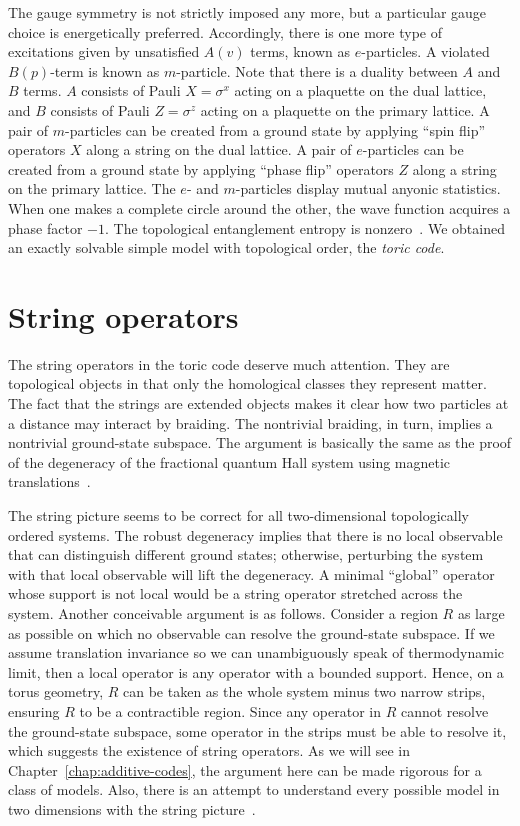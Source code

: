 The gauge symmetry is not strictly imposed any more, but a particular gauge choice is energetically preferred.
Accordingly, there is one more type of excitations given by unsatisfied $A(v)$ terms, known as $e$-particles.
A violated $B(p)$-term is known as $m$-particle. 
Note that there is a duality between $A$ and $B$ terms. 
$A$ consists of Pauli $X = \sigma^x$ acting on a plaquette on the dual lattice, 
and $B$ consists of Pauli $Z = \sigma^z$ acting on a plaquette on the primary lattice. 
A pair of $m$-particles can be created from a ground state 
by applying ``spin flip'' operators $X$ along a string on the dual lattice.
A pair of $e$-particles can be created from a ground state by applying ``phase flip'' operators $Z$ along a string on the primary lattice. The $e$- and $m$-particles display mutual anyonic statistics. When one makes a complete circle around the other, the wave function acquires a phase factor $-1$. The topological entanglement entropy is nonzero~\cite{KitaevPreskill2006Topological, LevinWen2006Detecting}. We obtained an exactly solvable simple model with topological order, the {\em toric code}.


\section{String operators}

The string operators in the toric code deserve much attention. They are topological objects in that only the homological classes they represent matter. The fact that the strings are extended objects makes it clear how two particles at a distance may interact by braiding. The nontrivial braiding, in turn, implies a nontrivial ground-state subspace. The argument is basically the same as the proof of the degeneracy of the fractional quantum Hall system using magnetic translations~\cite{Haldane1985MagneticTranslation}.

The string picture seems to be correct for all two-dimensional topologically ordered systems. The robust degeneracy implies that there is no local observable that can distinguish different ground states; otherwise, perturbing the system with that local observable will lift the degeneracy. A minimal ``global'' operator whose support is not local would be a string operator stretched across the system. Another conceivable argument is as follows. Consider a region $R$ as large as possible on which no observable can resolve the ground-state subspace. If we assume translation invariance so we can unambiguously speak of thermodynamic limit, then a local operator is any operator with a bounded support. Hence, on a torus geometry, $R$ can be taken as the whole system minus two narrow strips, ensuring $R$ to be a contractible region. Since any operator in $R$ cannot resolve the ground-state subspace, some operator in the strips must be able to resolve it, which suggests the existence of string operators. As we will see in Chapter~\ref{chap:additive-codes}, the argument here can be made rigorous for a class of models. Also, there is an attempt to understand every possible model in two dimensions with the string picture~\cite{LevinWen2003Fermions,LevinWen2005String-net}.


